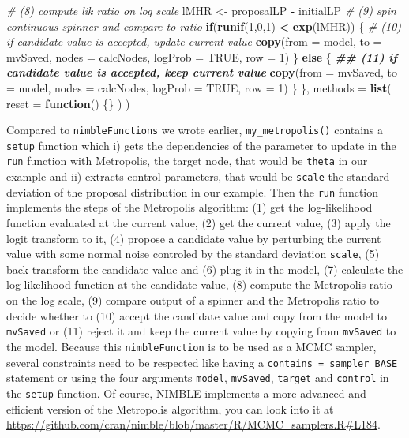 \documentclass[
  12pt,
]{krantz}
\newenvironment{Shaded}{\begin{snugshade}}{\end{snugshade}}
\newcommand{\AttributeTok}[1]{\textcolor[rgb]{0.13,0.29,0.53}{#1}}
\newcommand{\CommentTok}[1]{\textcolor[rgb]{0.56,0.35,0.01}{\textit{#1}}}
\newcommand{\ConstantTok}[1]{\textcolor[rgb]{0.56,0.35,0.01}{#1}}
\newcommand{\ControlFlowTok}[1]{\textcolor[rgb]{0.13,0.29,0.53}{\textbf{#1}}}
\newcommand{\DecValTok}[1]{\textcolor[rgb]{0.00,0.00,0.81}{#1}}
\newcommand{\DocumentationTok}[1]{\textcolor[rgb]{0.56,0.35,0.01}{\textbf{\textit{#1}}}}
\newcommand{\FunctionTok}[1]{\textcolor[rgb]{0.13,0.29,0.53}{\textbf{#1}}}
\newcommand{\NormalTok}[1]{#1}
\newcommand{\OtherTok}[1]{\textcolor[rgb]{0.56,0.35,0.01}{#1}}
\newcommand{\SpecialCharTok}[1]{\textcolor[rgb]{0.81,0.36,0.00}{\textbf{#1}}}
\begin{document}
\begin{Shaded}
\begin{Highlighting}[]
    \CommentTok{\# (8) compute lik ratio on log scale}
\NormalTok{    lMHR }\OtherTok{\textless{}{-}}\NormalTok{ proposalLP }\SpecialCharTok{{-}}\NormalTok{ initialLP }
    \CommentTok{\# (9) spin continuous spinner and compare to ratio}
    \ControlFlowTok{if}\NormalTok{(}\FunctionTok{runif}\NormalTok{(}\DecValTok{1}\NormalTok{,}\DecValTok{0}\NormalTok{,}\DecValTok{1}\NormalTok{) }\SpecialCharTok{\textless{}} \FunctionTok{exp}\NormalTok{(lMHR)) \{ }
      \CommentTok{\# (10) if candidate value is accepted, update current value}
      \FunctionTok{copy}\NormalTok{(}\AttributeTok{from =}\NormalTok{ model, }\AttributeTok{to =}\NormalTok{ mvSaved, }\AttributeTok{nodes =}\NormalTok{ calcNodes, }\AttributeTok{logProb =} \ConstantTok{TRUE}\NormalTok{, }\AttributeTok{row =} \DecValTok{1}\NormalTok{)}
\NormalTok{    \} }\ControlFlowTok{else}\NormalTok{ \{}
      \DocumentationTok{\#\# (11) if candidate value is accepted, keep current value}
      \FunctionTok{copy}\NormalTok{(}\AttributeTok{from =}\NormalTok{ mvSaved, }\AttributeTok{to =}\NormalTok{ model, }\AttributeTok{nodes =}\NormalTok{ calcNodes, }\AttributeTok{logProb =} \ConstantTok{TRUE}\NormalTok{, }\AttributeTok{row =} \DecValTok{1}\NormalTok{)}
\NormalTok{    \}}
\NormalTok{  \},}
  \AttributeTok{methods =} \FunctionTok{list}\NormalTok{(}
    \AttributeTok{reset =} \ControlFlowTok{function}\NormalTok{() \{\}}
\NormalTok{  )}
\NormalTok{)}
\end{Highlighting}
\end{Shaded}

Compared to \texttt{nimbleFunctions} we wrote earlier, \texttt{my\_metropolis()} contains a \texttt{setup} function which i) gets the dependencies of the parameter to update in the \texttt{run} function with Metropolis, the target node, that would be \texttt{theta} in our example and ii) extracts control parameters, that would be \texttt{scale} the standard deviation of the proposal distribution in our example. Then the \texttt{run} function implements the steps of the Metropolis algorithm: (1) get the log-likelihood function evaluated at the current value, (2) get the current value, (3) apply the logit transform to it, (4) propose a candidate value by perturbing the current value with some normal noise controled by the standard deviation \texttt{scale}, (5) back-transform the candidate value and (6) plug it in the model, (7) calculate the log-likelihood function at the candidate value, (8) compute the Metropolis ratio on the log scale, (9) compare output of a spinner and the Metropolis ratio to decide whether to (10) accept the candidate value and copy from the model to \texttt{mvSaved} or (11) reject it and keep the current value by copying from \texttt{mvSaved} to the model. Because this \texttt{nimbleFunction} is to be used as a MCMC sampler, several constraints need to be respected like having a \texttt{contains\ =\ sampler\_BASE} statement or using the four arguments \texttt{model}, \texttt{mvSaved}, \texttt{target} and \texttt{control} in the \texttt{setup} function. Of course, NIMBLE implements a more advanced and efficient version of the Metropolis algorithm, you can look into it at \url{https://github.com/cran/nimble/blob/master/R/MCMC_samplers.R\#L184}.
\end{document}
